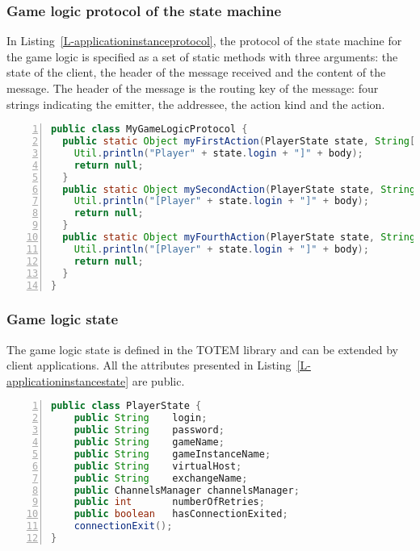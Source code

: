 \subsubsection{Game logic protocol of the state machine}

In Listing~\ref{L-applicationinstanceprotocol}, the protocol of the
state machine for the game logic is specified as a set of static
methods with three arguments: the state of the client, the header of
the message received and the content of the message. The
header of the message is the routing key of the message: four strings
indicating the emitter, the addressee, the action kind and the action.

\begin{lstlisting}[float=htbp,frame=bt,basicstyle=\scriptsize\sffamily,numbers=left,
   numberstyle=\tiny, stepnumber=1,
    numbersep=5pt,language=java,label=L-applicationinstanceprotocol,caption=Game logic's protocol of the state machine for the game logic]
public class MyGameLogicProtocol {
  public static Object myFirstAction(PlayerState state, String[] header, String body) {
    Util.println("Player" + state.login + "]" + body);
    return null;
  }
  public static Object mySecondAction(PlayerState state, String[] header, String body) {
    Util.println("[Player" + state.login + "]" + body);
    return null;
  }
  public static Object myFourthAction(PlayerState state, String[] header, String body) {
    Util.println("[Player" + state.login + "]" + body);
    return null;
  }
}
\end{lstlisting}

\subsubsection{Game logic state}

The game logic state is defined in the TOTEM library and can be
extended by client applications. All the attributes presented in
Listing~\ref{L-applicationinstancestate} are public.

\begin{lstlisting}[float=htbp,frame=bt,basicstyle=\scriptsize\sffamily,numbers=left,
   numberstyle=\tiny, stepnumber=1,
    numbersep=5pt,language=java,label=L-applicationinstancestate,caption=Player's state of the state machine]
public class PlayerState {
    public String    login;
    public String    password;
    public String    gameName;
    public String    gameInstanceName;
    public String    virtualHost;
    public String    exchangeName;
    public ChannelsManager channelsManager;
    public int       numberOfRetries;
    public boolean   hasConnectionExited;
    connectionExit();
}
\end{lstlisting}

\endinput
